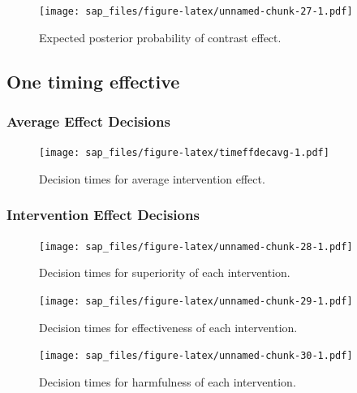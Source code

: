 \documentclass[
  bibliography=totoc]{scrreprt}
\begin{document}
\begin{figure}
\centering
\texttt{[image: sap\_files/figure-latex/unnamed-chunk-27-1.pdf]}
\caption{\label{fig:unnamed-chunk-27}Expected posterior probability of contrast effect.}
\end{figure}

\clearpage

\hypertarget{one-timing-effective}{%
\subsection{One timing effective}\label{one-timing-effective}}

\hypertarget{average-effect-decisions-2}{%
\subsubsection{Average Effect Decisions}\label{average-effect-decisions-2}}

\begin{figure}
\centering
\texttt{[image: sap\_files/figure-latex/timeffdecavg-1.pdf]}
\caption{\label{fig:timeffdecavg}Decision times for average intervention effect.}
\end{figure}

\clearpage

\hypertarget{intervention-effect-decisions-2}{%
\subsubsection{Intervention Effect Decisions}\label{intervention-effect-decisions-2}}

\begin{figure}
\centering
\texttt{[image: sap\_files/figure-latex/unnamed-chunk-28-1.pdf]}
\caption{\label{fig:unnamed-chunk-28}Decision times for superiority of each intervention.}
\end{figure}

\begin{figure}
\centering
\texttt{[image: sap\_files/figure-latex/unnamed-chunk-29-1.pdf]}
\caption{\label{fig:unnamed-chunk-29}Decision times for effectiveness of each intervention.}
\end{figure}

\begin{figure}
\centering
\texttt{[image: sap\_files/figure-latex/unnamed-chunk-30-1.pdf]}
\caption{\label{fig:unnamed-chunk-30}Decision times for harmfulness of each intervention.}
\end{figure}
\end{document}
